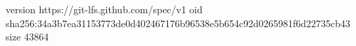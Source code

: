 version https://git-lfs.github.com/spec/v1
oid sha256:34a3b7ea31153773de0d402467176b96538e5b654c92d0265981f6d22735cb43
size 43864
